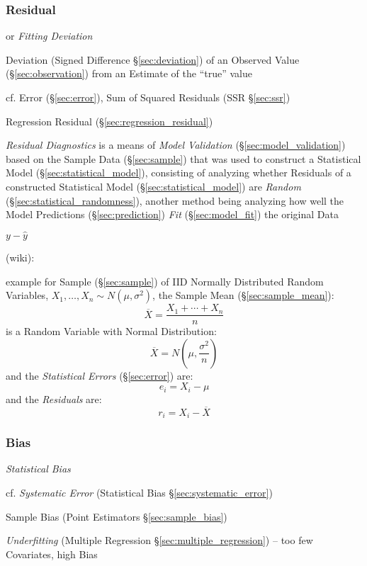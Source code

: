 \subsubsection{Residual}\label{sec:residual}

or \emph{Fitting Deviation}

Deviation (Signed Difference \S\ref{sec:deviation}) of an Observed Value
(\S\ref{sec:observation}) from an Estimate of the ``true'' value

cf. Error (\S\ref{sec:error}), Sum of Squared Residuals (SSR \S\ref{sec:ssr})

\fist Regression Residual (\S\ref{sec:regression_residual})

\emph{Residual Diagnostics} is a means of \emph{Model Validation}
(\S\ref{sec:model_validation}) based on the Sample Data (\S\ref{sec:sample})
that was used to construct a Statistical Model (\S\ref{sec:statistical_model}),
consisting of analyzing whether Residuals of a constructed Statistical Model
(\S\ref{sec:statistical_model}) are \emph{Random}
(\S\ref{sec:statistical_randomness}), another method being analyzing how well
the Model Predictions (\S\ref{sec:prediction}) \emph{Fit}
(\S\ref{sec:model_fit}) the original Data

$y - \hat{y}$

(wiki):

example for Sample (\S\ref{sec:sample}) of IID Normally Distributed Random
Variables, $X_1, \ldots, X_n \sim N(\mu, \sigma^2)$, the Sample Mean
(\S\ref{sec:sample_mean}):
\[
  \overline{X} = \frac{X_1 + \cdots + X_n}{n}
\]
is a Random Variable with Normal Distribution:
\[
  \overline{X} = N(\mu, \frac{\sigma^2}{n})
\]
and the \emph{Statistical Errors} (\S\ref{sec:error}) are:
\[
  e_i = X_i - \mu
\]
and the \emph{Residuals} are:
\[
  r_i = X_i - \overline{X}
\]



\subsubsection{Bias}\label{sec:bias}

\emph{Statistical Bias}

cf. \emph{Systematic Error} (Statistical Bias \S\ref{sec:systematic_error})

Sample Bias (Point Estimators \S\ref{sec:sample_bias})

\emph{Underfitting} (Multiple Regression \S\ref{sec:multiple_regression}) -- too
few Covariates, high Bias

